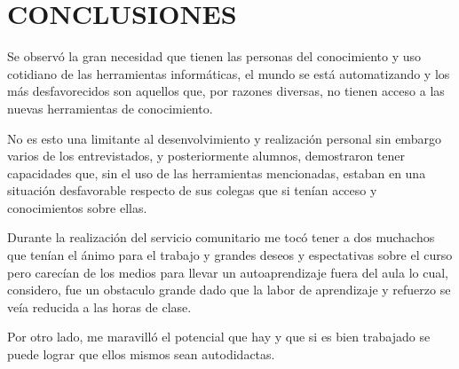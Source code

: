 \chapter*{CONCLUSIONES}
    Se observó la gran necesidad que tienen las personas del conocimiento y uso cotidiano de las herramientas informáticas, el mundo se está automatizando y los más desfavorecidos son aquellos que, por razones diversas, no tienen acceso a las nuevas herramientas de conocimiento.
    
    No es esto una limitante al desenvolvimiento y realización personal sin embargo varios de los entrevistados, y posteriormente alumnos, demostraron tener capacidades que, sin el uso de las herramientas mencionadas, estaban en una situación desfavorable respecto de sus colegas que si tenían acceso y conocimientos sobre ellas.

    Durante la realización del servicio comunitario me tocó tener a dos muchachos que tenían el ánimo para el trabajo y grandes deseos y espectativas sobre el curso pero carecían de los medios para llevar un autoaprendizaje fuera del aula lo cual, considero, fue un obstaculo grande dado que la labor de aprendizaje y refuerzo se veía reducida a las horas de clase.
    
    Por otro lado, me maravilló el potencial que hay y que si es bien trabajado se puede lograr que ellos mismos sean autodidactas.
	\pagebreak